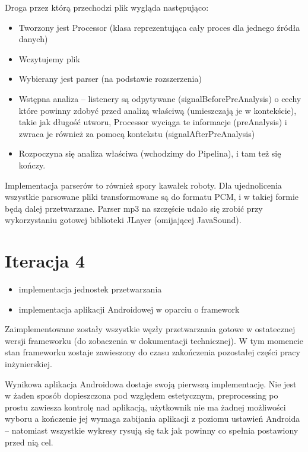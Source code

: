 \begin{Note}
Droga przez którą przechodzi plik wygląda następująco:

\begin{itemize}
    \item Tworzony jest Processor (klasa reprezentująca cały proces dla jednego źródła danych)
    \item Wczytujemy plik
    \item Wybierany jest parser (na podstawie rozszerzenia)
    \item Wstępna analiza -- listenery są odpytywane (signalBeforePreAnalysis) o cechy które powinny zdobyć przed analizą właściwą (umieszczają je w kontekście), takie jak długość utworu, Processor wyciąga te informacje (preAnalysis) i zwraca je również za pomocą kontekstu (signalAfterPreAnalysis)
    \item Rozpoczyna się analiza właściwa (wchodzimy do Pipelina), i tam też się kończy.
\end{itemize}

Implementacja parserów to również spory kawałek roboty. Dla ujednolicenia wszystkie parsowane pliki transformowane są do formatu PCM, i w takiej formie będą dalej przetwarzane. Parser mp3 na szczęście udało się zrobić przy wykorzystaniu gotowej biblioteki JLayer (omijającej JavaSound).

\end{Note}

\section{Iteracja 4}

\begin{Note}


\begin{itemize}
    \item implementacja jednostek przetwarzania
    \item implementacja aplikacji Androidowej w oparciu o framework
\end{itemize}

Zaimplementowane zostały wszystkie węzły przetwarzania gotowe w ostatecznej wersji frameworku (do zobaczenia w dokumentacji technicznej). W tym momencie stan frameworku zostaje zawieszony do czasu zakończenia pozostałej części pracy inżynierskiej.

Wynikowa aplikacja Androidowa dostaje swoją pierwszą implementację. Nie jest w żaden sposób
dopieszczona pod względem estetycznym, preprocessing po prostu zawiesza kontrolę nad aplikacją,
użytkownik nie ma żadnej możliwości wyboru a kończenie jej wymaga zabijania aplikacji z poziomu
ustawień Androida -- natomiast wszystkie wykresy rysują się tak jak powinny co spełnia postawiony przed nią cel.

\end{Note}

